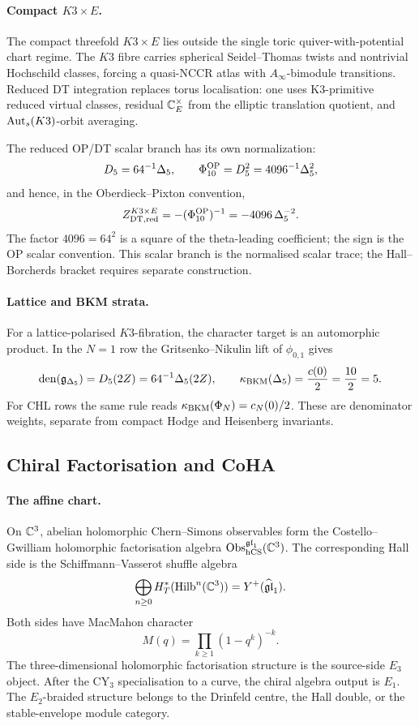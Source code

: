 \paragraph{Compact \(K3\times E\).}
The compact threefold \(K3\times E\) lies outside the single toric
quiver-with-potential chart regime. The \(K3\) fibre carries spherical
Seidel--Thomas twists and nontrivial Hochschild classes, forcing a
quasi-NCCR atlas with \(A_\infty\)-bimodule transitions. Reduced DT
integration replaces torus localisation: one uses K3-primitive reduced
virtual classes, residual \(\mathbb{C}^{\times}_E\) from the elliptic translation
quotient, and \(\mathrm{Aut}_{s}(K3)\)-orbit averaging.

The reduced OP/DT scalar branch has its own normalization:
\[
  D_5=64^{-1}\Delta_5,\qquad
  \Phi_{10}^{\mathrm{OP}}=D_5^2=4096^{-1}\Delta_5^2,
\]
and hence, in the Oberdieck--Pixton convention,
\[
  Z^{K3\times E}_{\mathrm{DT},\mathrm{red}}
  =-(\Phi_{10}^{\mathrm{OP}})^{-1}
  =-4096\,\Delta_5^{-2}.
\]
The factor \(4096=64^2\) is a square of the theta-leading coefficient;
the sign is the OP scalar convention. This scalar branch is the
normalised scalar trace; the Hall--Borcherds bracket requires separate
construction.

\paragraph{Lattice and BKM strata.}
For a lattice-polarised \(K3\)-fibration, the character target is an
automorphic product. In the \(N=1\) row the Gritsenko--Nikulin lift of
\(\phi_{0,1}\) gives
\[
  \operatorname{den}(\mathfrak g_{\Delta_5})
  =D_5(2Z)
  =64^{-1}\Delta_5(2Z),
  \qquad
  \kappa_{\mathrm{BKM}}(\Delta_5)=\frac{c(0)}2=\frac{10}{2}=5.
\]
For CHL rows the same rule reads
\(\kappa_{\mathrm{BKM}}(\Phi_N)=c_N(0)/2\). These are denominator weights, separate
from compact Hodge and Heisenberg invariants.

\subsection*{Chiral Factorisation and CoHA}

\paragraph{The affine chart.}
On \(\mathbb{C}^3\), abelian holomorphic Chern--Simons observables form the
Costello--Gwilliam holomorphic factorisation algebra
\(\mathrm{Obs}_{\mathrm{hCS}}^{\mathfrak{gl}_1}(\mathbb{C}^3)\). The corresponding Hall side is the
Schiffmann--Vasserot shuffle algebra
\[
   \bigoplus_{n\ge 0}H_T^*(\mathrm{Hilb}^n(\mathbb{C}^3))
   =Y^{+}(\widehat{\mathfrak{gl}}_1).
\]
Both sides have MacMahon character
\[
  M(q)=\prod_{k\ge1}(1-q^k)^{-k}.
\]
The three-dimensional holomorphic factorisation structure is the
source-side \(E_3\) object. After the CY\(_3\) specialisation to a
curve, the chiral algebra output is \(E_1\). The \(E_2\)-braided
structure belongs to the Drinfeld centre, the Hall double, or the
stable-envelope module category.


